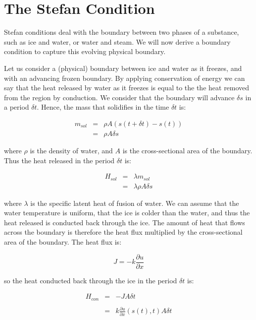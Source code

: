 \documentclass{report}
\begin{document}
\section{The Stefan Condition}

Stefan conditions deal with the boundary between two phases of a substance, such as ice and water, or water 
and steam. We will now derive a boundary condition to capture this evolving physical boundary.\bigskip

Let us consider a (physical) boundary between ice and water as it freezes, and with an advancing frozen 
boundary. By applying conservation of energy we can say that the heat released by water as it freezes is 
equal to the the heat removed from the region by conduction. We consider that the boundary will advance 
$\delta s$ in a period $\delta t$. Hence, the mass that solidifies in the time $\delta t$ is:\bigskip

\begin{eqnarray*} 
  m_{sol} & = & \rho A (s(t + \delta t) - s(t)) \\
          & = & \rho A \delta s
\end{eqnarray*}\medskip

where $\rho$ is the density of water, and $A$ is the cross-sectional area of the boundary. Thus the heat 
released in the period $\delta t$ is:\bigskip

\begin{eqnarray*} 
  H_{sol} & = & \lambda m_{sol} \\
          & = & \lambda \rho A \delta s
\end{eqnarray*}\medskip

where $\lambda$ is the specific latent heat of fusion of water. We can assume that the water temperature 
is uniform, that the ice is colder than the water, and thus the heat released is conducted back through 
the ice. The amount of heat that flows across the boundary is therefore the heat flux multiplied by the 
cross-sectional area of the boundary. The heat flux is:\bigskip

\[ J = -k \frac{\partial u}{\partial x} \]\medskip

so the heat conducted back through the ice in the period $\delta t$ is:\bigskip

\begin{eqnarray*} 
  H_{con} & = & -J A \delta t \\\\
          & = & k \frac{\partial u}{\partial x} (s(t), t) A \delta t
\end{eqnarray*}\medskip
\end{document}
